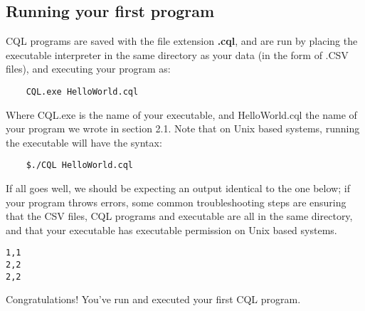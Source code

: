 \subsection{Running your first program}
\begin{normalsize}
CQL programs are saved with the file extension \textbf{.cql}, and are run by placing the executable interpreter in the same directory as your data (in the form of .CSV files), and executing your program as:
\begin{lstlisting}
	CQL.exe HelloWorld.cql
\end{lstlisting}
Where CQL.exe is the name of your executable, and HelloWorld.cql the name of your program we wrote in section 2.1. Note that on Unix based systems, running the executable will have the syntax:
\begin{lstlisting}
	$./CQL HelloWorld.cql
\end{lstlisting}
If all goes well, we should be expecting an output identical to the one below; if your program throws errors, some common troubleshooting steps are ensuring that the CSV files, CQL programs and executable are all in the same directory, and that your executable has executable permission on Unix based systems. 
\end{normalsize}
\begin{lstlisting}[style=framed]
1,1
2,2
2,2
\end{lstlisting}
\begin{normalsize}
Congratulations! You've run and executed your first CQL program. 
\end{normalsize}